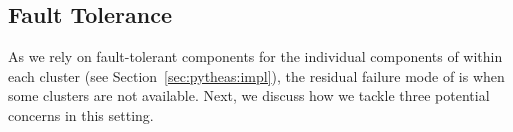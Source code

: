 %
%


\subsection{Fault Tolerance}
\label{subsec:fault}
 As we rely on fault-tolerant components for
 the  individual components of \name within each cluster (see Section~\ref{sec:pytheas:impl}), 
the residual failure mode of \name is when some clusters are not available.
 Next, we discuss how we tackle three potential concerns in this setting.

